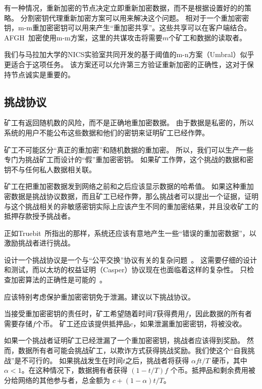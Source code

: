 \documentclass[longbibliography,nofootinbib]{revtex4-1}
\begin{document}
有一种情况，重新加密的节点决定立即重新加密数据，而不是根据设置好的的策略。 分割密钥代理重新加密方案可以用来解决这个问题。
    相对于一个重加密密钥，m-m重加密密钥可以用来产生“重加密共享”。这些共享可以在客户端结合。AFGH~\cite{AFGH}加密使用m-m方案，这里的共谋攻击将需要$m$个矿工和数据的读取者。
    
    我们与马拉加大学的NICS实验室共同开发的基于阈值的m-n方案（Umbral）似乎更适合于这项任务。 该方案还可以允许第三方验证重新加密的正确性，这对于保持节点诚实是重要的。

\subsection{挑战协议}
\label{sec:challenge-protocol}

矿工有返回随机数的风险，而不是正确地重加密数据。 由于数据是私密的，所以系统的用户不能公布这些数据和他们的密钥来证明矿工已经作弊。

    矿工不可能区分“真正的重加密”和随机数据的重加密。 所以，我们可以生产一些专门为挑战矿工而设计的“假”重加密密钥。 如果矿工作弊，这个挑战的数据和密钥不与任何私人数据相关联。
    
    矿工在把重加密数据发到网络之前和之后应该显示数据的哈希值。 如果这种重加密数据是挑战协议数据，而且矿工已经作弊，那么挑战者可以提出一个证据，证明与这个挑战相关的非敏感密钥实际上应该产生不同的重加密结果，并且没收矿工的抵押存款授予挑战者。
    
    正如Truebit~\cite{truebit}所指出的那样，系统还应该有意地产生一些“错误的重加密数据”，以激励挑战者进行挑战。

	设计一个挑战协议是一个与“公平交换”协议有关的复杂问题~\cite{BitcoinMPC2016,Bentov2014,AccountableStorage}。 这需要仔细的设计和测试，而以太坊的权益证明（Casper）协议现在也面临着这样的复杂性。 只检查加密算法的正确性是可能的~\cite{Zhou2002}。
    
    应该特别考虑保护重加密密钥免于泄漏。建议以下挑战协议。
    
    当接受重加密密钥的责任时，矿工希望随着时间$T$获得费用$f$，因此数据的所有者需要存储$f$个币。 矿工还应该提供抵押品$c$，如果泄漏重加密密钥，将被没收。

	如果一个挑战者证明矿工已经泄漏了一个重加密密钥，挑战者应该得到奖励。 然而，数据所有者可能会挑战矿工，以欺诈方式获得挑战奖励。我们使这个“自我挑战”是不可行的。 如果挑战发生在时间$t$之后，挑战者将获得 $\alpha f t/T$ 硬币，其中$\alpha < 1$。在这种情况下，数据拥有者获得  $(1 - t/T) f$  个币。抵押品和剩余费用被分给网络的其他参与者，总金额为 $c + (1 - \alpha) t/T$。
\end{document}
